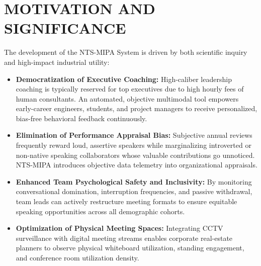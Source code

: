\documentclass[12pt,a4paper,oneside]{report}
\begin{document}
\section{MOTIVATION AND SIGNIFICANCE}
The development of the NTS-MIPA System is driven by both scientific inquiry and high-impact industrial utility:
\begin{itemize}
    \item \textbf{Democratization of Executive Coaching:} High-caliber leadership coaching is typically reserved for top executives due to high hourly fees of human consultants. An automated, objective multimodal tool empowers early-career engineers, students, and project managers to receive personalized, bias-free behavioral feedback continuously.
    \item \textbf{Elimination of Performance Appraisal Bias:} Subjective annual reviews frequently reward loud, assertive speakers while marginalizing introverted or non-native speaking collaborators whose valuable contributions go unnoticed. NTS-MIPA introduces objective data telemetry into organizational appraisals.
    \item \textbf{Enhanced Team Psychological Safety and Inclusivity:} By monitoring conversational domination, interruption frequencies, and passive withdrawal, team leads can actively restructure meeting formats to ensure equitable speaking opportunities across all demographic cohorts.
    \item \textbf{Optimization of Physical Meeting Spaces:} Integrating CCTV surveillance with digital meeting streams enables corporate real-estate planners to observe physical whiteboard utilization, standing engagement, and conference room utilization density.
\end{itemize}
\end{document}
